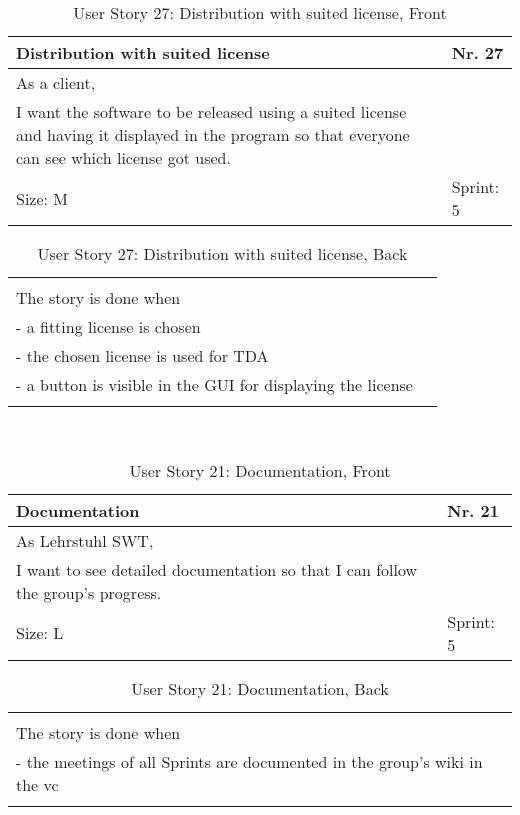 \begin{table}[H]
  \caption{User Story 27: Distribution with suited license, Front}
  \label{Story_27_Front}
  \centering
  \begin{tabular}{|p{9cm} p{2cm}|}
	\hline  	
  	Distribution with suited license & Nr. 27 \\ 
  	\hline
  	As a client, &    \\ 
  	I want the software to be released using a suited license and having it displayed in the program so that everyone can see which license got used. &    \\ 
  	Size: M & Sprint: 5 \\ 
  	\hline
  \end{tabular}
\end{table}
\begin{table}[H]
  \caption{User Story 27: Distribution with suited license, Back}
  \label{Story_27_Back}
  \centering
  \begin{tabular}{|p{10cm} p{1cm}|}
  \hline
  	  &    \\ 
  	The story is done when &    \\ 
  	 - a fitting license is chosen & \\ 
  	 - the chosen license is used for TDA & \\ 
  	 - a button is visible in the GUI for displaying the license & \\  
  	 
  	  &  
  	   \\ 
  	\hline
  \end{tabular}
\end{table} 

\ \\ 

\begin{table}[H]
  \caption{User Story 21: Documentation, Front}
  \label{Story_21_Front}
  \centering
  \begin{tabular}{|p{9cm} p{2cm}|}
	\hline  	
  	Documentation & Nr. 21 \\ 
  	\hline
  	As Lehrstuhl SWT, &    \\ 
  	I want to see detailed documentation so that I can follow the group's progress. &    \\ 
  	Size: L & Sprint: 5 \\ 
  	\hline
  \end{tabular}
\end{table}
\begin{table}[H]
  \caption{User Story 21: Documentation, Back}
  \label{Story_21_Back}
  \centering
  \begin{tabular}{|p{10cm} p{1cm}|}
  \hline
  	  &    \\ 
  	The story is done when &    \\ 
  	 - the meetings of all Sprints are documented in the group's wiki in the vc & \\ 
  	 
  	  &  
  	   \\ 
  	\hline
  \end{tabular}
\end{table} 

